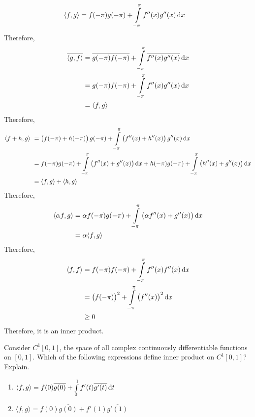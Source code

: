 \documentclass[fleqn, a4paper, 11pt, oneside]{amsart}
\theoremstyle{definition}
\theoremstyle{theorem}
\begin{document}
\begin{solution}
	\begin{align*}
		\langle f,g \rangle & = f(-\pi) g(-\pi) + \int\limits_{-\pi}^{\pi} f''(x) g''(x) \dif x
	\end{align*}
	Therefore,
	\begin{align*}
		\overline{\langle g,f \rangle} & = \overline{g(-\pi) f(-\pi)} + \int\limits_{-\pi}^{\pi} \overline{f''(x) g''(x)} \dif x \\
                                               & = g(-\pi) f(-\pi) + \int\limits_{-\pi}^{\pi} f''(x) g''(x) \dif x                       \\
                                               & = \langle f,g \rangle
	\end{align*}
	Therefore,
	\begin{align*}
		\langle f + h , g \rangle\ & = \left( f(-\pi) + h(-\pi) \right) g(-\pi) + \int\limits_{-\pi}^{\pi} \left( f''(x) + h''(x) \right) g''(x) \dif x                                                    \\
                                           & = f(-\pi) g(-\pi) + \int\limits_{-\pi}^{\pi} \left( f''(x) + g''(x) \right) \dif x + h(-\pi) g(-\pi) + \int\limits_{-\pi}^{\pi} \left( h''(x) + g''(x) \right) \dif x \\
                                           & = \langle f,g \rangle + \langle h,g \rangle
	\end{align*}
	Therefore,
	\begin{align*}
		\langle \alpha f , g \rangle & = \alpha f(-\pi) g(-\pi) + \int\limits_{-\pi}^{\pi} \left( \alpha f''(x) + g''(x) \right) \dif x \\
                                             & = \alpha \langle f,g \rangle
	\end{align*}
	Therefore,
	\begin{align*}
		\langle f,f \rangle & = f(-\pi) f(-\pi) + \int\limits_{-\pi}^{\pi} f''(x) f''(x) \dif x                    \\
                                    & = \left( f(-\pi) \right)^2 + \int\limits_{-\pi}^{\pi} \left( f''(x) \right)^2 \dif x \\
                                    & \ge 0
	\end{align*}
	Therefore, it is an inner product.
\end{solution}

\begin{question}
	Consider $C^1[0,1]$, the space of all complex continuously differentiable functions on $[0,1]$.
	Which of the following expressions define inner product on $C^1[0,1]$?
	Explain.
	\begin{enumerate}
		\item $\langle f,g \rangle = f(0) \overline{g(0)} + \int\limits_{0}^{1} f'(t) \overline{g'(t)} \dif t$
		\item $\langle f,g \rangle = f(0) \overline{g(0)} + f'(1) \overline{g'(1)}$
	\end{enumerate}
\end{question}
\end{document}
